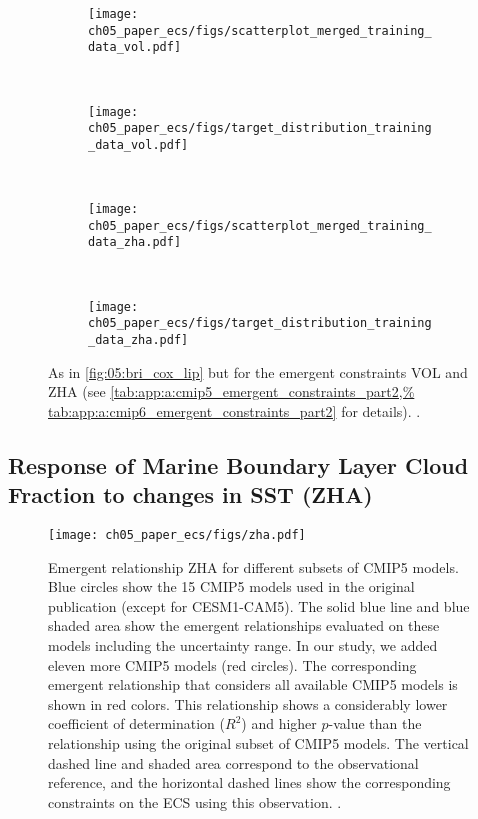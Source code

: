 \begin{figure}[t]
  \centering
  \begin{subfigure}[b]{\SubfigureWidth{}}
    \texttt{[image: 
      ch05\_paper\_ecs/figs/scatterplot\_merged\_training\_data\_vol.pdf]}
    \caption{}
    \label{fig:05:vol_zha:a}
  \end{subfigure}
  ~
  \begin{subfigure}[b]{\SubfigureWidth{}}
    \texttt{[image: 
      ch05\_paper\_ecs/figs/target\_distribution\_training\_data\_vol.pdf]}
    \caption{}
    \label{fig:05:vol_zha:b}
  \end{subfigure}
  \\
  \begin{subfigure}[b]{\SubfigureWidth{}}
    \texttt{[image: 
      ch05\_paper\_ecs/figs/scatterplot\_merged\_training\_data\_zha.pdf]}
    \caption{}
    \label{fig:05:vol_zha:c}
  \end{subfigure}
  ~
  \begin{subfigure}[b]{\SubfigureWidth{}}
    \texttt{[image: 
      ch05\_paper\_ecs/figs/target\_distribution\_training\_data\_zha.pdf]}
    \caption{}
    \label{fig:05:vol_zha:d}
  \end{subfigure}
  \caption{As in \cref{fig:05:bri_cox_lip} but for the emergent constraints VOL
    and ZHA (see \cref{tab:app:a:cmip5_emergent_constraints_part2,%
      tab:app:a:cmip6_emergent_constraints_part2} for details).
    .}
  \label{fig:05:vol_zha}
\end{figure}


\subsection{Response of Marine Boundary Layer Cloud Fraction to changes in
  \acl{SST} (ZHA)}
\label{subsec:05:zha}

\begin{figure}[t]
  \centering
  \texttt{[image: ch05\_paper\_ecs/figs/zha.pdf]}
  \caption{Emergent relationship ZHA \autocite{Zhai2015} for different subsets
    of \acs{CMIP}5 models. Blue circles show the 15 \acs{CMIP}5 models used in
    the original publication (except for CESM1-CAM5). The solid blue line and
    blue shaded area show the emergent relationships evaluated on these models
    including the uncertainty range. In our study, we added eleven more
    \acs{CMIP}5 models (red circles). The corresponding emergent relationship
    that considers all available \acs{CMIP}5 models is shown in red colors.
    This relationship shows a considerably lower coefficient of determination
    ($R^2$) and higher $p$-value than the relationship using the original
    subset of \acs{CMIP}5 models. The vertical dashed line and shaded area
    correspond to the observational reference, and the horizontal dashed lines
    show the corresponding constraints on the \acf{ECS} using this observation.
    .}
  \label{fig:05:zha}
\end{figure}

